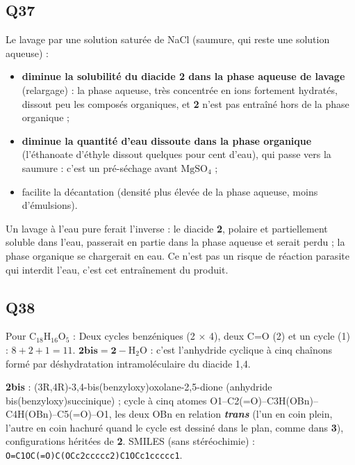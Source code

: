 \documentclass[11pt,a4paper]{article}
\providecommand{\tightlist}{\setlength{\itemsep}{0pt}\setlength{\parskip}{0pt}}
\newcommand{\equationajustee}[1]{%
  \sbox{\boiteequation}{$\displaystyle #1$}%
  \ifdim\wd\boiteequation>\linewidth
    \[\resizebox{\linewidth}{!}{\usebox{\boiteequation}}\]%
  \else
    \[#1\]%
  \fi}
\begin{document}
\hypertarget{q37}{%
\subsection{Q37}\label{q37}}

Le lavage par une solution saturée de NaCl (saumure, qui reste une solution aqueuse) :

\begin{itemize}
\tightlist
\item
  \textbf{diminue la solubilité du diacide 2 dans la phase aqueuse de lavage} (relargage) : la phase aqueuse, très concentrée en ions fortement hydratés, dissout peu les composés organiques, et \textbf{2} n'est pas entraîné hors de la phase organique ;
\item
  \textbf{diminue la quantité d'eau dissoute dans la phase organique} (l'éthanoate d'éthyle dissout quelques pour cent d'eau), qui passe vers la saumure : c'est un pré-séchage avant \(\mathrm{MgSO_4}\) ;
\item
  facilite la décantation (densité plus élevée de la phase aqueuse, moins d'émulsions).
\end{itemize}

Un lavage à l'eau pure ferait l'inverse : le diacide \textbf{2}, polaire et partiellement soluble dans l'eau, passerait en partie dans la phase aqueuse et serait perdu ; la phase organique se chargerait en eau. Ce n'est pas un risque de réaction parasite qui interdit l'eau, c'est cet entraînement du produit.

\hypertarget{q38}{%
\subsection{Q38}\label{q38}}

Pour \(\mathrm{C_{18}H_{16}O_5}\) :
\equationajustee{\boxed{n_i=\frac{2\times18+2-16}{2}=11}}
Deux cycles benzéniques (2 × 4), deux C=O (2) et un cycle (1) : \(8+2+1=11\). \(\mathbf{2bis}=\mathbf 2-\mathrm{H_2O}\) : c'est l'anhydride cyclique à cinq chaînons formé par déshydratation intramoléculaire du diacide 1,4.

\textbf{2bis} : (3R,4R)-\allowbreak{}3,4-\allowbreak{}bis(benzyloxy)oxolane-\allowbreak{}2,5-\allowbreak{}dione (anhydride bis(benzyloxy)succinique) ; cycle à cinq atomes O1--\allowbreak{}C2(=O)--\allowbreak{}C3H(OBn)--\allowbreak{}C4H(OBn)--\allowbreak{}C5(=O)--\allowbreak{}O1, les deux OBn en relation \textbf{\emph{trans}} (l'un en coin plein, l'autre en coin hachuré quand le cycle est dessiné dans le plan, comme dans \textbf{3}), configurations héritées de \textbf{2}. SMILES (sans stéréochimie) : \texttt{O=\allowbreak{}C1OC(\allowbreak{}=\allowbreak{}O)\allowbreak{}C(\allowbreak{}OCc2ccccc2)\allowbreak{}C1OCc1ccccc1}.
\end{document}
